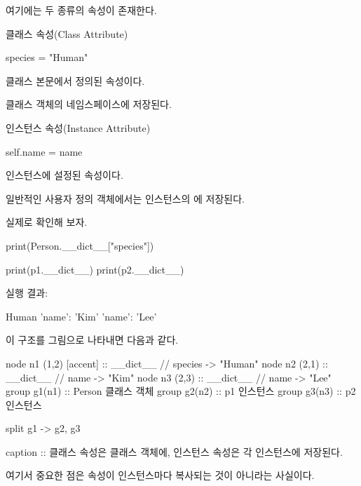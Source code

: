 여기에는 두 종류의 속성이 존재한다.

\begin{dhknote}
\begin{dhksmry}[centered]
클래스 속성(Class Attribute)
\end{dhksmry}
\end{dhknote}

\begin{dhkcode}
species = "Human"
\end{dhkcode}

클래스 본문에서 정의된 속성이다.

 클래스 객체의 네임스페이스에 저장된다.

\begin{dhknote}
\begin{dhksmry}[centered]
인스턴스 속성(Instance Attribute)
\end{dhksmry}
\end{dhknote}

\begin{dhkcode}
self.name = name
\end{dhkcode}

인스턴스에 설정된 속성이다.

일반적인 사용자 정의 객체에서는 인스턴스의 에 저장된다.

실제로 확인해 보자.

\begin{dhkcode}
print(Person.__dict__["species"])

print(p1.__dict__)
print(p2.__dict__)
\end{dhkcode}

실행 결과:

\begin{dhkzsh}
Human
{'name': 'Kim'}
{'name': 'Lee'}
\end{dhkzsh}

이 구조를 그림으로 나타내면 다음과 같다.

\begin{dhkgraph}
node n1 (1,2) [accent] :: __dict__ // species -> "Human"
node n2 (2,1) :: __dict__ // name -> "Kim"
node n3 (2,3) :: __dict__ // name -> "Lee"
group g1(n1) :: Person 클래스 객체
group g2(n2) :: p1 인스턴스
group g3(n3) :: p2 인스턴스

split g1 -> g2, g3

caption :: 클래스 속성은 클래스 객체에, 인스턴스 속성은 각 인스턴스에 저장된다.
\end{dhkgraph}

여기서 중요한 점은 속성이 인스턴스마다 복사되는 것이 아니라는 사실이다.

